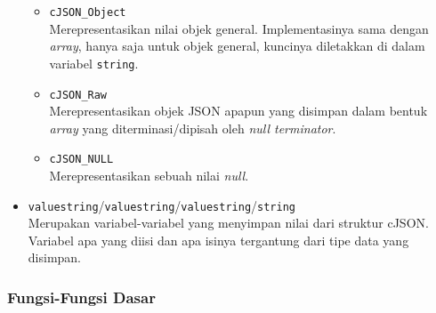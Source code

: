 \begin{itemize}
\begin{itemize}
		\item \verb|cJSON_Object|\\
		Merepresentasikan nilai objek general. Implementasinya sama dengan \textit{array}, hanya saja untuk objek general, kuncinya diletakkan di dalam variabel \verb|string|.
		\item \verb|cJSON_Raw|\\
		Merepresentasikan objek JSON apapun yang disimpan dalam bentuk \textit{array} yang diterminasi/dipisah oleh \textit{null terminator}.
		\item \verb|cJSON_NULL|\\
		Merepresentasikan sebuah nilai \textit{null}.
	\end{itemize}
	
	\item \verb|valuestring|/\verb|valuestring|/\verb|valuestring|/\verb|string|\\	
	Merupakan variabel-variabel yang menyimpan nilai dari struktur cJSON. Variabel apa yang diisi dan apa isinya tergantung dari tipe data yang disimpan.
\end{itemize}

\subsubsection{Fungsi-Fungsi Dasar}
\label{sec:cmodules-cJSON-basicfuncts}

